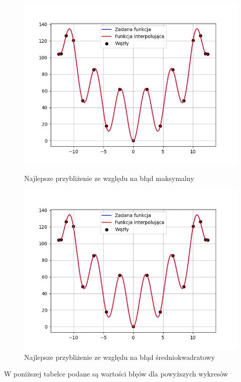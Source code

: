 \documentclass{article}
\begin{document}
\begin{figure}[H]
  \begin{minipage}[b]{0.49\textwidth}
    \includegraphics[width=\textwidth]{img19.png}
    \caption{Najlepsze przybliżenie ze względu na błąd maksymalny}
  \end{minipage}
  \hfill
  \begin{minipage}[b]{0.49\textwidth}
    \includegraphics[width=\textwidth]{img20.png}
    \caption{Najlepsze przybliżenie ze względu na błąd średniokwadratowy}
  \end{minipage}
\end{figure}

\noindent
W poniższej tabelce podane są wartości błęów dla powyższych wykresów
\end{document}
